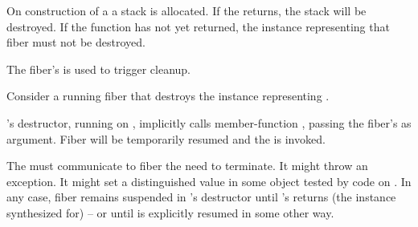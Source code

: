 \label{destruction}

On construction of a \fiber a stack is allocated. If the \entryfn returns,
the stack will be destroyed. If the function has not yet returned,
the \fiber instance representing that fiber must not be destroyed.

The fiber's \cancelfn is used to trigger cleanup.

Consider a running fiber  that destroys the \fiber instance
representing .

's destructor, running on , implicitly calls member-function
\resumewith, passing the fiber's \cancelfn as
argument. Fiber  will be temporarily resumed and the \cancelfn is
invoked.

The \cancelfn must communicate to fiber  the need to terminate. It
might throw an exception. It might set a distinguished value in some object
tested by code on . In any case, fiber  remains suspended
in 's destructor until 's \entryfn returns (the \fiber
instance synthesized for)  -- or until  is explicitly resumed
in some other way.


